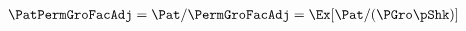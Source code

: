   \begin{align}
    \PatPermGroFacAdj  & = \Pat/\PermGroFacAdj = \Ex[\Pat/(\PGro\pShk)]  \label{eq:GPFNrm}
  \end{align}
